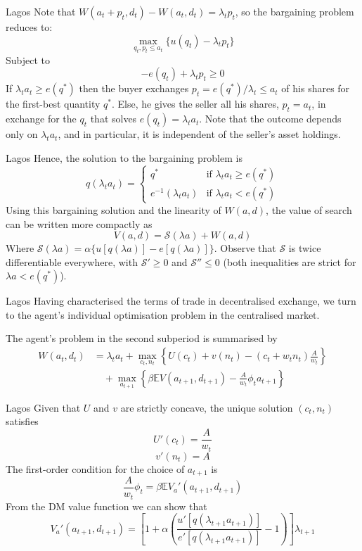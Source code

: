\documentclass[aspectratio=169,xcolor=dvipsnames]{beamer}
\begin{document}
\begin{frame}{Lagos}
    Note that $W(a_t + p_t, d_t) - W(a_t, d_t) = \lambda_t p_t$, so the bargaining problem reduces to:
    \[
        \max_{q_t, p_t \le a_t} \{u(q_t) - \lambda_t p_t\}
    \]
    Subject to
    \[
        -e(q_t) + \lambda_t p_t \ge 0
    \]
    If $\lambda_t a_t \ge e(q^*)$ then the buyer exchanges $p_t = e(q^*)/\lambda_t \le a_t$ of his shares for the first-best quantity $q^*$. Else, he gives the seller all his shares, $p_t = a_t$, in exchange for the $q_t$ that solves $e(q_t) = \lambda_t a_t$. Note that the outcome depends only on $\lambda_t a_t$, and in particular, it is independent of the seller's asset holdings.
\end{frame}

\begin{frame}{Lagos}
    Hence, the solution to the bargaining problem is
    \[
        q(\lambda_t a_t) = \begin{cases} q^* & \text{if } \lambda_t a_t \ge e(q^*) \\ e^{-1}(\lambda_t a_t) & \text{if } \lambda_t a_t < e(q^*) \end{cases}
    \]
    Using this bargaining solution and the linearity of $W(a, d)$, the value of search can be written more compactly as
    \[
        V(a, d) = \mathcal{S}(\lambda a) + W(a, d)
    \]
    Where $\mathcal{S}(\lambda a) = \alpha \{u[q(\lambda a)] - e[q(\lambda a)]\}$. Observe that $\mathcal{S}$ is twice differentiable everywhere, with $\mathcal{S}' \ge 0$ and $\mathcal{S}'' \le 0$ (both inequalities are strict for $\lambda a < e(q^*)$).
\end{frame}

\begin{frame}{Lagos}
    Having characterised the terms of trade in decentralised exchange, we turn to the agent's individual optimisation problem in the centralised market.

    The agent's problem in the second subperiod is summarised by
    \begin{align*}
        W(a_t, d_t) &= \lambda_t a_t + \max_{c_t, n_t}\left\{ U(c_t) + v(n_t) - (c_t + w_t n_t) \frac{A}{w_t}\right\} \\
        &\quad + \max_{a_{t+1}}\left\{ \beta \mathbb{E} V(a_{t+1}, d_{t+1}) - \frac{A}{w_t} \phi_t a_{t+1}\right\}
    \end{align*}
\end{frame}

\begin{frame}{Lagos}
    Given that $U$ and $v$ are strictly concave, the unique solution $(c_t, n_t)$ satisfies
    \[
        U'(c_t) = \frac{A}{w_t}
    \]
    \[
        v'(n_t) = A
    \]
    The first-order condition for the choice of $a_{t+1}$ is
    \[
        \frac{A}{w_t} \phi_t = \beta \mathbb{E} V_a'(a_{t+1}, d_{t+1})
    \]
    From the DM value function we can show that
    \[
        V_a'(a_{t+1}, d_{t+1}) = \left[1 + \alpha\left( \frac{u'[q(\lambda_{t+1} a_{t+1})]}{e'[q(\lambda_{t+1} a_{t+1})]} - 1\right)\right] \lambda_{t+1}
    \]
\end{frame}
\end{document}
